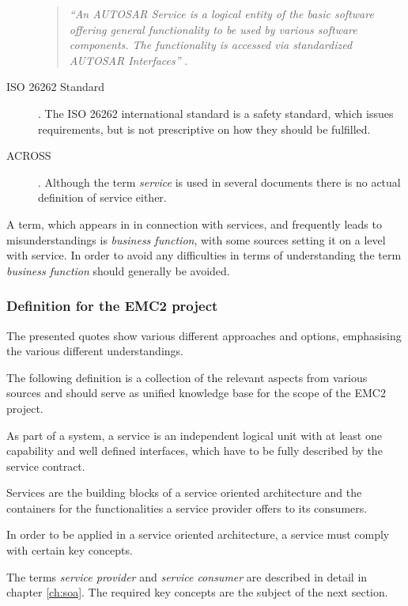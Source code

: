 \begin{description}
\begin{quote}
\emph{``An AUTOSAR Service is a logical entity of the basic software offering general functionality to be used by various software components. The functionality is accessed via standardized AUTOSAR Interfaces''} \cite{autosar_glossary}.
\end{quote}

\item [ISO 26262 Standard].
The ISO 26262 international standard is a safety standard, which issues requirements, but is not prescriptive on how they should be fulfilled.

\item [ACROSS].
Although the term \emph{service} is used in several documents there is no actual definition of service either.
\end{description}

A term, which appears in in connection with services, and frequently leads to misunderstandings is \emph{business function}, with some sources setting it on a level with service. In order to avoid any difficulties in terms of understanding the term \emph{business function} should generally be avoided.

\subsubsection{Definition for the EMC2 project}
The presented quotes show various different approaches and options, emphasising the various different understandings.

The following definition is a collection of the relevant aspects from various sources and should serve as unified knowledge base for the scope of the EMC2 project.

\begin{myquote}
	As part of a system, a service is an independent logical unit with at least one capability and well defined interfaces, which have to be fully described by the service contract.

	Services are the building blocks of a service oriented architecture and the containers for the functionalities a service provider offers to its consumers.

	In order to be applied in a service oriented architecture, a service must comply with certain key concepts.
\end{myquote}

The terms \emph{service provider} and \emph{service consumer} are described in detail in chapter \ref{ch:soa}. The required key concepts are the subject of the next section.

